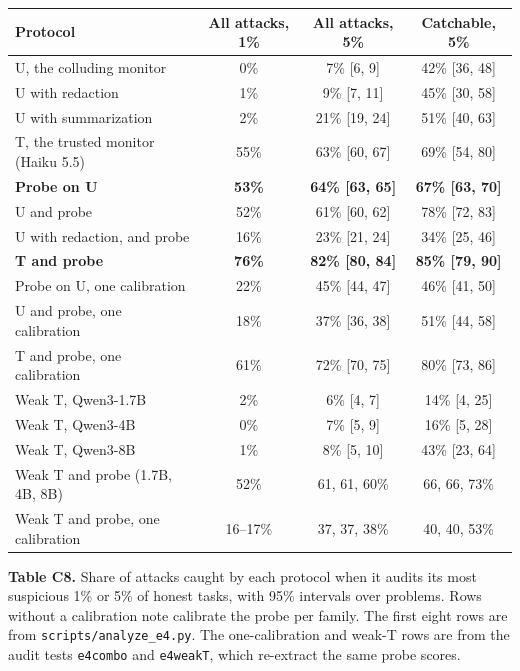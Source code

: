 \documentclass[11pt,letterpaper]{article}
\begin{document}
\begin{table}[htbp]\centering\footnotesize
\begin{tabular}{@{}lccc@{}}
\toprule
Protocol & All attacks, 1\% & All attacks, 5\% & Catchable, 5\% \\
\midrule
U, the colluding monitor & 0\% & 7\% {[}6, 9{]} & 42\% {[}36, 48{]} \\
U with redaction & 1\% & 9\% {[}7, 11{]} & 45\% {[}30, 58{]} \\
U with summarization & 2\% & 21\% {[}19, 24{]} & 51\% {[}40, 63{]} \\
T, the trusted monitor (Haiku 5.5) & 55\% & 63\% {[}60, 67{]} & 69\% {[}54, 80{]} \\
\textbf{Probe on U} & \textbf{53\%} & \textbf{64\% {[}63, 65{]}} & \textbf{67\% {[}63, 70{]}} \\
U and probe & 52\% & 61\% {[}60, 62{]} & 78\% {[}72, 83{]} \\
U with redaction, and probe & 16\% & 23\% {[}21, 24{]} & 34\% {[}25, 46{]} \\
\textbf{T and probe} & \textbf{76\%} & \textbf{82\% {[}80, 84{]}} & \textbf{85\% {[}79, 90{]}} \\
Probe on U, one calibration & 22\% & 45\% {[}44, 47{]} & 46\% {[}41, 50{]} \\
U and probe, one calibration & 18\% & 37\% {[}36, 38{]} & 51\% {[}44, 58{]} \\
T and probe, one calibration & 61\% & 72\% {[}70, 75{]} & 80\% {[}73, 86{]} \\
\midrule
Weak T, Qwen3-1.7B & 2\% & 6\% {[}4, 7{]} & 14\% {[}4, 25{]} \\
Weak T, Qwen3-4B & 0\% & 7\% {[}5, 9{]} & 16\% {[}5, 28{]} \\
Weak T, Qwen3-8B & 1\% & 8\% {[}5, 10{]} & 43\% {[}23, 64{]} \\
Weak T and probe (1.7B, 4B, 8B) & 52\% & 61, 61, 60\% & 66, 66, 73\% \\
Weak T and probe, one calibration & 16--17\% & 37, 37, 38\% & 40, 40, 53\% \\
\bottomrule
\end{tabular}

\smallskip
\textbf{Table C8.} Share of attacks caught by each protocol when it audits its most suspicious 1\% or 5\% of honest tasks, with 95\% intervals over problems. Rows without a calibration note calibrate the probe per family. The first eight rows are from \texttt{scripts/analyze\_e4.py}. The one-calibration and weak-T rows are from the audit tests \texttt{e4combo} and \texttt{e4weakT}, which re-extract the same probe scores.
\end{table}
\end{document}
